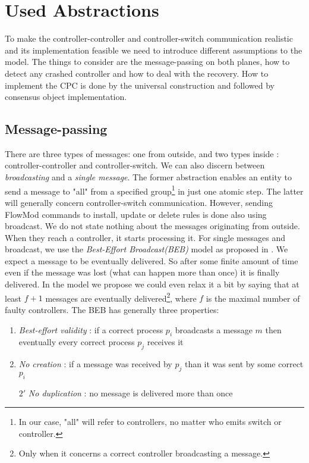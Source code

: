\documentclass{article}
\theoremstyle{remark}
\begin{document}
\section{Used Abstractions}
To make the controller-controller and controller-switch communication realistic and its implementation feasible we need to introduce different assumptions to the model. The things to consider are the message-passing on both planes, how to detect any crashed controller and how to deal with the recovery. How to implement the CPC is done by the universal construction and followed by consensus object implementation. 

\subsection{Message-passing}
There are three types of messages: one from outside, and two types inside : controller-controller and controller-switch. We can also discern between \emph{broadcasting} and a \emph{single message}. The former abstraction enables an entity to send a message to "all" from a specified group\footnote{In our case, "all" will refer to controllers, no matter who emits switch or controller.} in just one atomic step. The latter will generally concern controller-switch communication. However, sending FlowMod commands to install, update or delete rules is done also using broadcast. 
We do not state nothing about the messages originating from outside. When they reach a controller, it starts processing it. For single messages and broadcast, we use the \emph{Best-Effort Broadcast(BEB)} model as proposed in \cite{Guerraoui:2010:IRD:1951643}. We expect a message to be eventually delivered. So after some finite amount of time even if the message was lost (what can happen more than once) it is finally delivered. In the model we propose we could even relax it a bit by saying that at least $f+1$ messages are eventually delivered\footnote{Only when it concerns a correct controller broadcasting a message.}, where $f$ is the maximal number of faulty controllers. 
The BEB has generally three properties:
\begin{enumerate}
\item \emph{Best-effort validity} : if a correct process $p_i$ broadcasts a message $m$ then eventually every correct process $p_j$ receives it
\item \emph{No creation} : if a message was received by $p_j$ than it was sent by some correct $p_i$
\item[$2'$] \emph{No duplication} : no message is delivered more than once
\end{enumerate}
\end{document}
